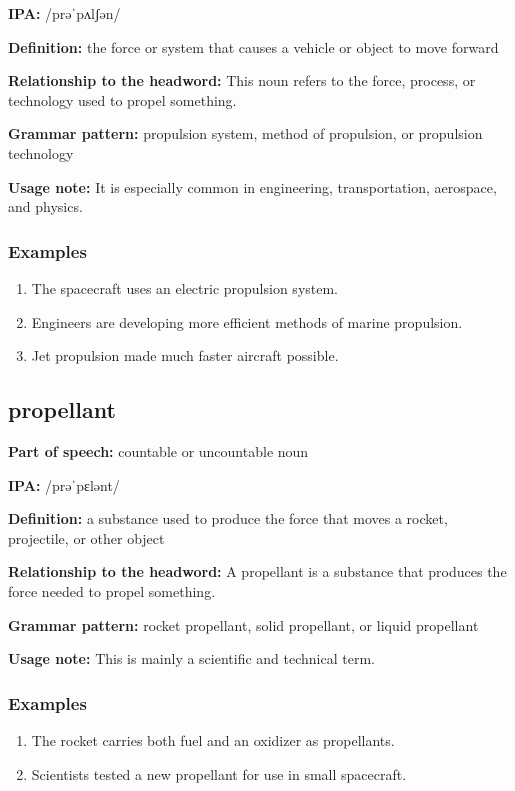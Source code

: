 \documentclass[11pt]{article}
\begin{document}
\textbf{IPA:} /prəˈpʌlʃən/

\textbf{Definition:} the force or system that causes a vehicle or object to move forward

\textbf{Relationship to the headword:} This noun refers to the force, process, or technology used to propel something.

\textbf{Grammar pattern:} propulsion system, method of propulsion, or propulsion technology

\textbf{Usage note:} It is especially common in engineering, transportation, aerospace, and physics.

\subsubsection{Examples}
\begin{enumerate}
  \item The spacecraft uses an electric propulsion system.
  \item Engineers are developing more efficient methods of marine propulsion.
  \item Jet propulsion made much faster aircraft possible.
\end{enumerate}

\subsection{propellant}
\textbf{Part of speech:} countable or uncountable noun

\textbf{IPA:} /prəˈpɛlənt/

\textbf{Definition:} a substance used to produce the force that moves a rocket, projectile, or other object

\textbf{Relationship to the headword:} A propellant is a substance that produces the force needed to propel something.

\textbf{Grammar pattern:} rocket propellant, solid propellant, or liquid propellant

\textbf{Usage note:} This is mainly a scientific and technical term.

\subsubsection{Examples}
\begin{enumerate}
  \item The rocket carries both fuel and an oxidizer as propellants.
  \item Scientists tested a new propellant for use in small spacecraft.
\end{enumerate}
\end{document}
